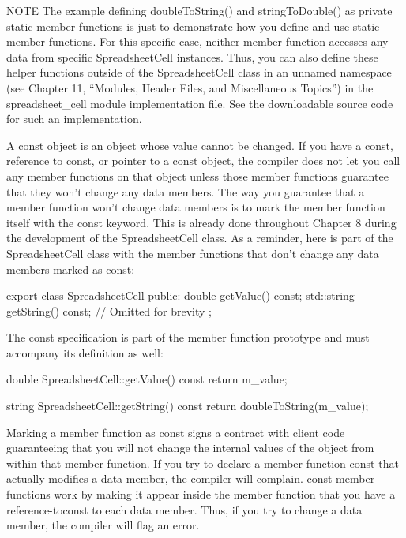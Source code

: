\begin{myNotic}{NOTE}
The example defining doubleToString() and stringToDouble() as private static member functions is just to demonstrate how you define and use static member functions. For this specific case, neither member function accesses any data from specific SpreadsheetCell instances. Thus, you can also define these helper functions outside of the SpreadsheetCell class in an unnamed namespace (see Chapter 11, “Modules, Header Files, and Miscellaneous Topics”) in the spreadsheet\_cell module implementation file. See the downloadable source code for such an implementation.
\end{myNotic}


A const object is an object whose value cannot be changed. If you have a const, reference to const, or pointer to a const object, the compiler does not let you call any member functions on that object unless those member functions guarantee that they won’t change any data members. The way you guarantee that a member function won’t change data members is to mark the member function itself with the const keyword. This is already done throughout Chapter 8 during the development of the SpreadsheetCell class. As a reminder, here is part of the SpreadsheetCell class with the member functions that don’t change any data members marked as const:

\begin{cpp}
export class SpreadsheetCell
{
    public:
        double getValue() const;
        std::string getString() const;
        // Omitted for brevity
};
\end{cpp}

The const specification is part of the member function prototype and must accompany its definition as well:

\begin{cpp}
double SpreadsheetCell::getValue() const
{
    return m_value;
}

string SpreadsheetCell::getString() const
{
    return doubleToString(m_value);
}
\end{cpp}

Marking a member function as const signs a contract with client code guaranteeing that you will not change the internal values of the object from within that member function. If you try to declare a member function const that actually modifies a data member, the compiler will complain. const member functions work by making it appear inside the member function that you have a reference-toconst to each data member. Thus, if you try to change a data member, the compiler will flag an error.

